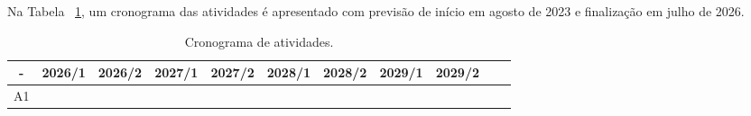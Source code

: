\documentclass[11pt]{article}
\begin{document}
Na Tabela ~\ref{tabcronograma}, um cronograma das atividades é apresentado com previsão de início em agosto de 2023 e finalização em julho de 2026.  

\begin{table}[h]\footnotesize \centering
  \centering
    \begin{tabular}{|c|c|c|c|c|c|c|c|c|c|c|}
    \hline
      -   & 2026/1 & 2026/2 & 2027/1 & 2027/2 & 2028/1 & 2028/2 & 2029/1 & 2029/2 \\
      \hline 
      A1  &        &        &        &        &        &        &         &       \\
      \hline
    \end{tabular}%
\caption{Cronograma de atividades.}
  \label{tabcronograma}%
\end{table}%

\renewcommand{\refname}{Referências Bibliográficas}


\end{document}
